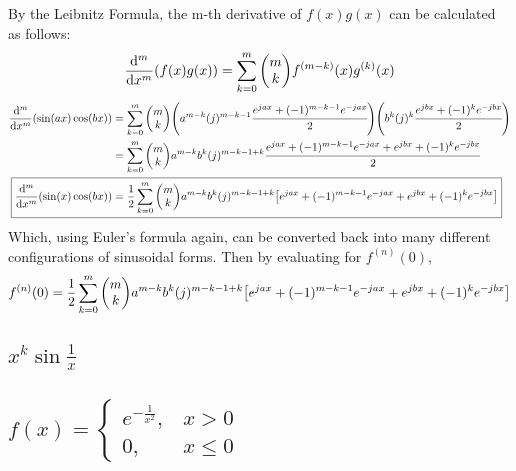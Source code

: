 \documentclass[]{article}
\begin{document}
By the Leibnitz Formula, the m-th derivative of $f(x) g(x)$ can be calculated as follows:
\[
    \dv[m]{x}\qty(f(x) g(x)) 
    = \sum_{k=0}^m \mqty(m \\ k) f^{(m-k)}(x) g^{(k)}(x)
\]
\begin{align*}
    \dv[m]{x}\qty(\sin(ax) \cos(bx)) 
        &= \sum_{k=0}^m \mqty(m \\ k) 
            \qty(a^{m - k} (j)^{m - k - 1} \cfrac{e^{j a x} + (-1)^{m - k - 1} e^{- j a x}}{2})
            \qty(b^k (j)^{k} \cfrac{e^{j b x} + (-1)^{k} e^{- j b x}}{2})\\
        &= \sum_{k=0}^m \mqty(m \\ k) 
            a^{m - k} b^{k} (j)^{m - k - 1 + k}
            \cfrac{e^{j a x} + (-1)^{m - k -1} e^{-j a x} + e^{j b x} + (-1)^{k} e^{-j b x}}{2}\\
    \Aboxed{
        \dv[m]{x} \qty(\sin(x) \cos(bx))
            &= \frac{1}{2} \sum_{k=0}^m \mqty(m \\ k) 
                a^{m - k} b^{k} (j)^{m - k - 1 + k}
                \qty[
                    e^{j a x} + (-1)^{m - k -1} e^{-j a x} + e^{j b x} + (-1)^{k} e^{-j b x}
                ]
    }
\end{align*}
Which, using Euler's formula again, can be converted back into many different configurations of sinusoidal forms.
Then by evaluating for $f^{(n)}(0)$,
\begin{align*}
    f^{(n)} (0)= \frac{1}{2} \sum_{k=0}^m \mqty(m \\ k) 
        a^{m - k} b^{k} (j)^{m - k - 1 + k}
        \qty[
            e^{j a x} + (-1)^{m - k -1} e^{-j a x} + e^{j b x} + (-1)^{k} e^{-j b x}
        ]
\end{align*}
    

\subsection{
    $x^k \sin{\frac{1}{x}}$
}





\subsection{
    $f(x) =
    \begin{cases}
        e^{-\frac{1}{x^2}}, &x > 0\\
        0,                  &x \leq 0
    \end{cases}$
}
\end{document}
